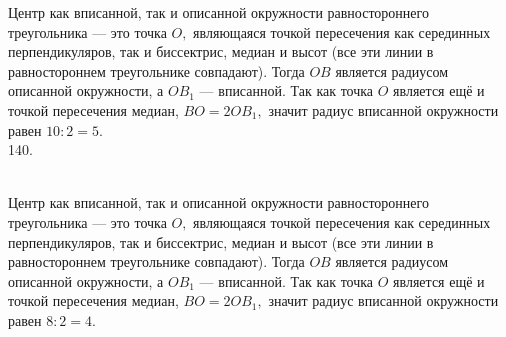 \documentclass[12pt]{article}
\begin{document}
Центр как вписанной, так и описанной окружности равностороннего треугольника --- это точка $O,$ являющаяся точкой пересечения как серединных перпендикуляров, так и биссектрис, медиан и высот (все эти линии в равностороннем треугольнике совпадают). Тогда $OB$ является радиусом описанной окружности, а $OB_1$ --- вписанной. Так как точка $O$ является ещё и точкой пересечения медиан, $BO=2OB_1,$ значит радиус вписанной окружности равен $10:2=5.$\\
140. \begin{figure}[ht!]
\end{figure}\\
Центр как вписанной, так и описанной окружности равностороннего треугольника --- это точка $O,$ являющаяся точкой пересечения как серединных перпендикуляров, так и биссектрис, медиан и высот (все эти линии в равностороннем треугольнике совпадают). Тогда $OB$ является радиусом описанной окружности, а $OB_1$ --- вписанной. Так как точка $O$ является ещё и точкой пересечения медиан, $BO=2OB_1,$ значит радиус вписанной окружности равен $8:2=4.$\newpage\noindent
\end{document}
